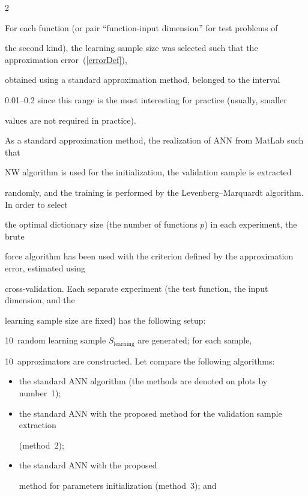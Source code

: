 \begin{multicols}{2}
\begin{figure}
  \label{boxplot_init}

\end{figure}



For each function (or pair ``function-input dimension'' for test problems of 

the second kind),  the learning sample size was selected such that the approximation error~(\ref{errorDef}), 

obtained using a standard approximation method, belonged to the interval

0.01--0.2 since this range is the most interesting for practice (usually, smaller 

values are not required in practice).

As a standard approximation method, the realization of ANN from MatLab such that

NW algorithm is used for the initialization, the validation sample is extracted 

randomly, and the training is performed by the Levenberg--Marquardt algorithm. In order to select 

the optimal dictionary size (the number of functions $p$) in each experiment, the brute 

force algorithm has been used with the criterion defined by the approximation error, estimated using 

cross-validation. Each separate experiment (the test function, the input dimension, and the

learning sample size are fixed) has the following setup:

10~random learning sample $S_{\mathrm{learning}}$ are generated; for each sample,

10~approximators are constructed. Let compare the following algorithms:

\begin{itemize}

\item the standard ANN algorithm (the methods are denoted on plots by number~1); 

\item the standard ANN with the proposed method for the validation sample extraction

(method~2); 

\item the standard ANN with the proposed

method for parameters initialization (method~3); and 


\end{itemize}
\end{multicols}
